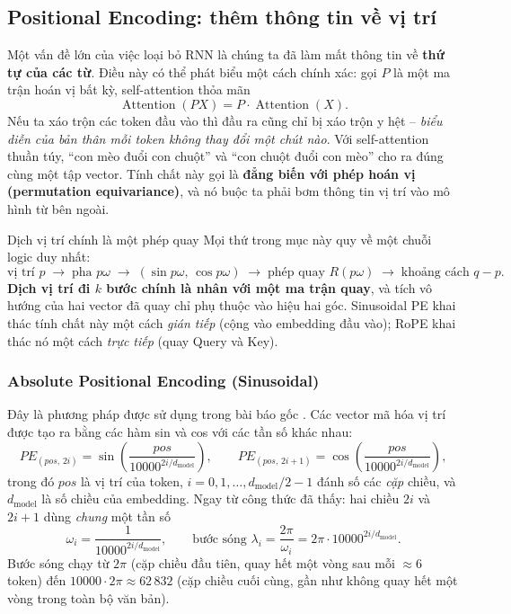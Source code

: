 \subsection{Positional Encoding: thêm thông tin về vị trí}
\label{ssec:positional_encoding_intro}

Một vấn đề lớn của việc loại bỏ RNN là chúng ta đã làm mất thông tin về \textbf{thứ tự của các từ}. Điều này có thể phát biểu một cách chính xác: gọi $P$ là một ma trận hoán vị bất kỳ, self-attention thỏa mãn
\[
\operatorname{Attention}(PX) = P \cdot \operatorname{Attention}(X).
\]
Nếu ta xáo trộn các token đầu vào thì đầu ra cũng chỉ bị xáo trộn y hệt -- \emph{biểu diễn của bản thân mỗi token không thay đổi một chút nào}. Với self-attention thuần túy, “con mèo đuổi con chuột” và “con chuột đuổi con mèo” cho ra đúng cùng một tập vector. Tính chất này gọi là \textbf{đẳng biến với phép hoán vị (permutation equivariance)}, và nó buộc ta phải bơm thông tin vị trí vào mô hình từ bên ngoài.

\begin{keyidea}{Dịch vị trí chính là một phép quay}
Mọi thứ trong mục này quy về một chuỗi logic duy nhất:
\[
\text{vị trí } p \;\longrightarrow\; \text{pha } p\omega \;\longrightarrow\; (\sin p\omega,\, \cos p\omega) \;\longrightarrow\; \text{phép quay } R(p\omega) \;\longrightarrow\; \text{khoảng cách } q-p.
\]
\textbf{Dịch vị trí đi $k$ bước chính là nhân với một ma trận quay}, và tích vô hướng của hai vector đã quay chỉ phụ thuộc vào hiệu hai góc. Sinusoidal PE khai thác tính chất này một cách \emph{gián tiếp} (cộng vào embedding đầu vào); RoPE khai thác nó một cách \emph{trực tiếp} (quay Query và Key).
\end{keyidea}

\subsubsection{Absolute Positional Encoding (Sinusoidal)}
Đây là phương pháp được sử dụng trong bài báo gốc \cite{vaswani2017attention}. Các vector mã hóa vị trí được tạo ra bằng các hàm sin và cos với các tần số khác nhau:
\[
PE_{(pos,\, 2i)} = \sin\!\left(\frac{pos}{10000^{2i/d_{\text{model}}}}\right), \qquad
PE_{(pos,\, 2i+1)} = \cos\!\left(\frac{pos}{10000^{2i/d_{\text{model}}}}\right),
\]
trong đó $pos$ là vị trí của token, $i = 0, 1, \dots, d_{\text{model}}/2 - 1$ đánh số các \emph{cặp} chiều, và $d_{\text{model}}$ là số chiều của embedding. Ngay từ công thức đã thấy: hai chiều $2i$ và $2i+1$ dùng \emph{chung} một tần số
\[
\omega_i = \frac{1}{10000^{2i/d_{\text{model}}}}, \qquad \text{bước sóng } \lambda_i = \frac{2\pi}{\omega_i} = 2\pi \cdot 10000^{2i/d_{\text{model}}}.
\]
Bước sóng chạy từ $2\pi$ (cặp chiều đầu tiên, quay hết một vòng sau mỗi $\approx 6$ token) đến $10000 \cdot 2\pi \approx 62\,832$ (cặp chiều cuối cùng, gần như không quay hết một vòng trong toàn bộ văn bản).

